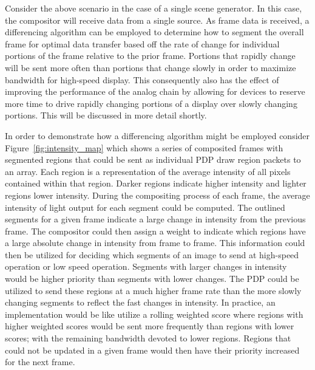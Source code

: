     Consider the above scenario in the case of a single scene generator. In this case, the compositor will receive data from a single source. As frame data is received, a differencing algorithm can be employed to determine how to segment the overall frame for optimal data transfer based off the rate of change for individual portions of the frame relative to the prior frame. Portions that rapidly change will be sent more often than portions that change slowly in order to maximize bandwidth for high-speed display. This consequently also has the effect of improving the performance of the analog chain by allowing for devices to reserve more time to drive rapidly changing portions of a display over slowly changing portions. This will be discussed in more detail shortly.

    In order to demonstrate how a differencing algorithm might be employed consider Figure~\ref{fig:intensity_map} which shows a series of composited frames with segmented regions that could be sent as individual PDP draw region packets to an array. Each region is a representation of the average intensity of all pixels contained within that region. Darker regions indicate higher intensity and lighter regions lower intensity. During the compositing process of each frame, the average intensity of light output for each segment could be computed. The outlined segments for a given frame indicate a large change in intensity from the previous frame. The compositor could then assign a weight to indicate which regions have a large absolute change in intensity from frame to frame. This information could then be utilized for deciding which segments of an image to send at high-speed operation or low speed operation. Segments with larger changes in intensity would be higher priority than segments with lower changes. The PDP could be utilized to send these regions at a much higher frame rate than the more slowly changing segments to reflect the fast changes in intensity. In practice, an implementation would be like utilize a rolling weighted score where regions with higher weighted scores would be sent more frequently than regions with lower scores; with the remaining bandwidth devoted to lower regions. Regions that could not be updated in a given frame would then have their priority increased for the next frame.

